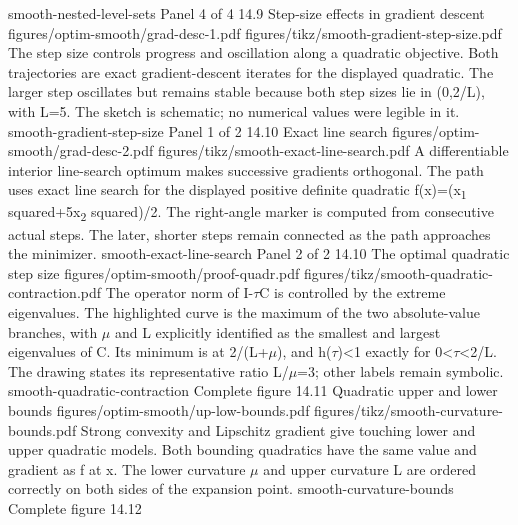 {smooth-nested-level-sets}
{Panel 4 of 4}
{14.9}
{Step-size effects in gradient descent}
{figures/optim-smooth/grad-desc-1.pdf}
{figures/tikz/smooth-gradient-step-size.pdf}
{The step size controls progress and oscillation along a quadratic objective.}
{Both trajectories are exact gradient-descent iterates for the displayed quadratic. The larger step oscillates but remains stable because both step sizes lie in (0,2/L), with L=5. The sketch is schematic; no numerical values were legible in it.}
{smooth-gradient-step-size}
{Panel 1 of 2}
{14.10}
{Exact line search}
{figures/optim-smooth/grad-desc-2.pdf}
{figures/tikz/smooth-exact-line-search.pdf}
{A differentiable interior line-search optimum makes successive gradients orthogonal.}
{The path uses exact line search for the displayed positive definite quadratic f(x)=(x\textsubscript{1} squared+5x\textsubscript{2} squared)/2. The right-angle marker is computed from consecutive actual steps. The later, shorter steps remain connected as the path approaches the minimizer.}
{smooth-exact-line-search}
{Panel 2 of 2}
{14.10}
{The optimal quadratic step size}
{figures/optim-smooth/proof-quadr.pdf}
{figures/tikz/smooth-quadratic-contraction.pdf}
{The operator norm of I-\ensuremath{\tau}C is controlled by the extreme eigenvalues.}
{The highlighted curve is the maximum of the two absolute-value branches, with \ensuremath{\mu} and L explicitly identified as the smallest and largest eigenvalues of C. Its minimum is at 2/(L+\ensuremath{\mu}), and h(\ensuremath{\tau})<1 exactly for 0<\ensuremath{\tau}<2/L. The drawing states its representative ratio L/\ensuremath{\mu}=3; other labels remain symbolic.}
{smooth-quadratic-contraction}
{Complete figure}
{14.11}
{Quadratic upper and lower bounds}
{figures/optim-smooth/up-low-bounds.pdf}
{figures/tikz/smooth-curvature-bounds.pdf}
{Strong convexity and Lipschitz gradient give touching lower and upper quadratic models.}
{Both bounding quadratics have the same value and gradient as f at x. The lower curvature \ensuremath{\mu} and upper curvature L are ordered correctly on both sides of the expansion point.}
{smooth-curvature-bounds}
{Complete figure}
{14.12}
